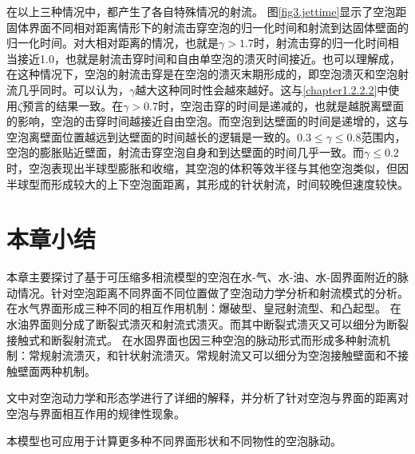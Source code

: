 在以上三种情况中，都产生了各自特殊情况的射流。
图\ref{fig3.jettime}显示了空泡距固体界面不同相对距离情形下的射流击穿空泡的归一化时间和射流到达固体壁面的归一化时间。对大相对距离的情况，也就是$\gamma>1.7$时，射流击穿的归一化时间相当接近1.0，也就是射流击穿时间和自由单空泡的溃灭时间接近。也可以理解成，在这种情况下，空泡的射流击穿是在空泡的溃灭末期形成的，即空泡溃灭和空泡射流几乎同时。可以认为，$\gamma$越大这种同时性会越來越好。这与\ref{chapter1.2.2.2}中使用$\zeta$预言的结果一致。在$\gamma>0.7$时，空泡击穿的时间是递减的，也就是越脱离壁面的影响，空泡的击穿时间越接近自由空泡。而空泡到达壁面的时间是递增的，这与空泡离壁面位置越远到达壁面的时间越长的逻辑是一致的。$0.3\leq \gamma\leq0.8$范围内，空泡的膨胀贴近壁面，射流击穿空泡自身和到达壁面的时间几乎一致。而$\gamma\leq0.2$时，空泡表现出半球型膨胀和收缩，其空泡的体积等效半径与其他空泡类似，但因半球型而形成较大的上下空泡面距离，其形成的针状射流，时间较晚但速度较快。


\section{本章小结}


本章主要探讨了基于可压缩多相流模型的空泡在水-气、水-油、水-固界面附近的脉动情况。针对空泡距离不同界面不同位置做了空泡动力学分析和射流模式的分析。
在水气界面形成三种不同的相互作用机制：爆破型、皇冠射流型、和凸起型。
在水油界面则分成了断裂式溃灭和射流式溃灭。而其中断裂式溃灭又可以细分为断裂接触式和断裂射流式。
在水固界面也因三种空泡的脉动形式而形成多种射流机制：常规射流溃灭，和针状射流溃灭。常规射流又可以细分为空泡接触壁面和不接触壁面两种机制。

文中对空泡动力学和形态学进行了详细的解释，并分析了针对空泡与界面的距离对空泡与界面相互作用的规律性现象。

本模型也可应用于计算更多种不同界面形状和不同物性的空泡脉动。



